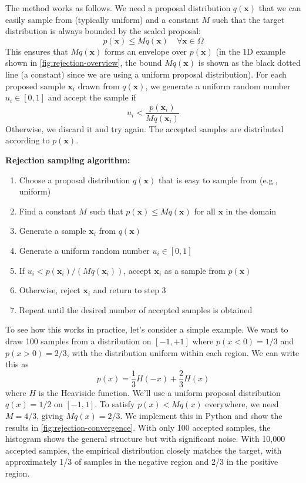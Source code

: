 The method works as follows. We need a proposal distribution $q(\mathbf{x})$ that we can easily sample from (typically uniform) and a constant $M$ such that the target distribution is always bounded by the scaled proposal:
\begin{equation}
    p(\mathbf{x}) \le M q(\mathbf{x}) \quad \forall \mathbf{x} \in \Omega
\end{equation}
This ensures that $M q(\mathbf{x})$ forms an envelope over $p(\mathbf{x})$ (in the 1D example shown in \autoref{fig:rejection-overview}, the bound $M q(\mathbf{x})$ is shown as the black dotted line (a constant) since we are using a uniform proposal distribution). For each proposed sample $\mathbf{x}_i$ drawn from $q(\mathbf{x})$, we generate a uniform random number $u_i \in [0,1]$ and accept the sample if
\begin{equation}
u_i < \frac{p(\mathbf{x}_i)}{M q(\mathbf{x}_i)}
\end{equation}
Otherwise, we discard it and try again. The accepted samples are distributed according to $p(\mathbf{x})$.

\begin{algorithmBox}
    \textbf{Rejection sampling algorithm:}
    \begin{enumerate}
        \item Choose a proposal distribution $q(\mathbf{x})$ that is easy to sample from (e.g., uniform)
        \item Find a constant $M$ such that $p(\mathbf{x}) \le M q(\mathbf{x})$ for all $\mathbf{x}$ in the domain
        \item Generate a sample $\mathbf{x}_i$ from $q(\mathbf{x})$
        \item Generate a uniform random number $u_i \in [0,1]$
        \item If $u_i < p(\mathbf{x}_i)/(M q(\mathbf{x}_i))$, accept $\mathbf{x}_i$ as a sample from $p(\mathbf{x})$
        \item Otherwise, reject $\mathbf{x}_i$ and return to step 3
        \item Repeat until the desired number of accepted samples is obtained
    \end{enumerate}
\end{algorithmBox}

To see how this works in practice, let's consider a simple example. We want to draw 100 samples from a distribution on $[-1, +1]$ where $p(x < 0) = 1/3$ and $p(x > 0) = 2/3$, with the distribution uniform within each region. We can write this as
\begin{equation}
p(x) = \frac{1}{3} H(-x) + \frac{2}{3} H(x)
\end{equation}
where $H$ is the Heaviside function. We'll use a uniform proposal distribution $q(x) = 1/2$ on $[-1,1]$. To satisfy $p(x) < M q(x)$ everywhere, we need $M = 4/3$, giving $M q(x) = 2/3$. We implement this in Python and show the results in \autoref{fig:rejection-convergence}. With only 100 accepted samples, the histogram shows the general structure but with significant noise. With 10,000 accepted samples, the empirical distribution closely matches the target, with approximately 1/3 of samples in the negative region and 2/3 in the positive region.

